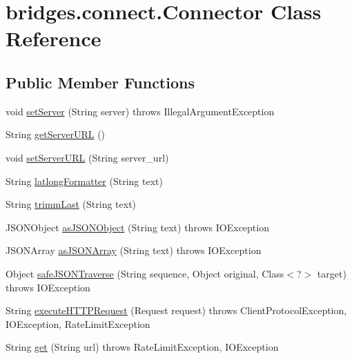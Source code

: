 \hypertarget{classbridges_1_1connect_1_1_connector}{}\section{bridges.\+connect.\+Connector Class Reference}
\label{classbridges_1_1connect_1_1_connector}
\subsection*{Public Member Functions}
\begin{DoxyCompactItemize}
\item 
void \mbox{\hyperlink{classbridges_1_1connect_1_1_connector_acab24a8c4ffd3349ec67536552fb30b3}{set\+Server}} (String server)  throws Illegal\+Argument\+Exception 
\item 
String \mbox{\hyperlink{classbridges_1_1connect_1_1_connector_a0b9809180aac96a83e31e224ab5ed6ec}{get\+Server\+U\+RL}} ()
\item 
void \mbox{\hyperlink{classbridges_1_1connect_1_1_connector_a71f449c91e529f79730df27e01fdf674}{set\+Server\+U\+RL}} (String server\+\_\+url)
\item 
String \mbox{\hyperlink{classbridges_1_1connect_1_1_connector_a2318cd93d18ef58285598f6f9cdf727b}{latlong\+Formatter}} (String text)
\item 
String \mbox{\hyperlink{classbridges_1_1connect_1_1_connector_ac0dca0bd99b6abbbd8a77874a95e6d49}{trimm\+Last}} (String text)
\item 
J\+S\+O\+N\+Object \mbox{\hyperlink{classbridges_1_1connect_1_1_connector_aac3fb75dd7975c4439cfd1bf6cefe0a6}{as\+J\+S\+O\+N\+Object}} (String text)  throws I\+O\+Exception 
\item 
J\+S\+O\+N\+Array \mbox{\hyperlink{classbridges_1_1connect_1_1_connector_aa5bd647713545fa24c6d730eacb6bc54}{as\+J\+S\+O\+N\+Array}} (String text)  throws I\+O\+Exception 
\item 
Object \mbox{\hyperlink{classbridges_1_1connect_1_1_connector_ab7d1d242fbf9acade316650e54a3d020}{safe\+J\+S\+O\+N\+Traverse}} (String sequence, Object original, Class$<$?$>$ target)  throws I\+O\+Exception 
\item 
String \mbox{\hyperlink{classbridges_1_1connect_1_1_connector_aabcfde23d155c8c42edb8a1407320bc5}{execute\+H\+T\+T\+P\+Request}} (Request request)  throws Client\+Protocol\+Exception, I\+O\+Exception, Rate\+Limit\+Exception 
\item 
String \mbox{\hyperlink{classbridges_1_1connect_1_1_connector_aec8d54bf707c50d6f8173a0c1640fcd5}{get}} (String url)  throws Rate\+Limit\+Exception, I\+O\+Exception 

\end{DoxyCompactItemize}
